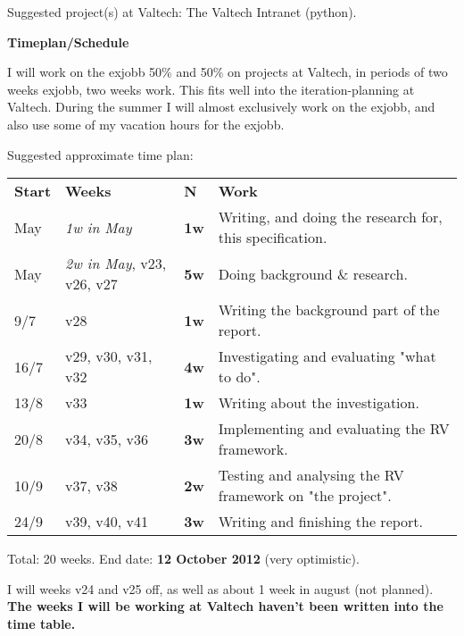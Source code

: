 \documentclass[a4paper,11pt]{kth-mag}
\begin{document}
Suggested project(s) at Valtech: The Valtech Intranet (python).

\textbf{Timeplan/Schedule}

I will work on the exjobb 50\% and 50\% on projects at Valtech, in periods of
two weeks exjobb, two weeks work. This fits well into the iteration-planning at
Valtech. During the summer I will almost exclusively work on the exjobb, and also
use some of my vacation hours for the exjobb.

Suggested approximate time plan:

\begin{center}
	\renewcommand{\arraystretch}{1.5}
	\begin{tabular}{ l l l | p{7cm} }
		\textbf{Start} & \textbf{Weeks} & \textbf{N} & \textbf{Work} \\
		\noalign{\smallskip}\hline\noalign{\smallskip}
		
		May & \textit{1w in May} & \textbf{1w} &
		Writing, and doing the research for, this specification.
		\\
		
		May & \textit{2w in May}, v23, v26, v27 & \textbf{5w} &
		Doing background \& research.
		\\
		
		9/7 & v28 & \textbf{1w} &
		Writing the background part of the report.
		\\
		
		16/7 & v29, v30, v31, v32 & \textbf{4w} &
		Investigating and evaluating "what to do".
		\\
		
		13/8 & v33& \textbf{1w} &
		Writing about the investigation.
		\\
		
		20/8 & v34, v35, v36 & \textbf{3w} &
		Implementing and evaluating the RV framework.
		\\
		
		10/9 & v37, v38 & \textbf{2w} &
		Testing and analysing the RV framework on "the project".
		\\
		
		24/9 & v39, v40, v41 & \textbf{3w} &
		Writing and finishing the report.
		\\
		
	\end{tabular}
\end{center}

Total: 20 weeks. End date: \textbf{12 October 2012} (very optimistic).

I will weeks v24 and v25 off, as well as about 1 week in august (not planned). \textbf{The weeks I will be working at Valtech haven't been written into the time table.}
\end{document}
